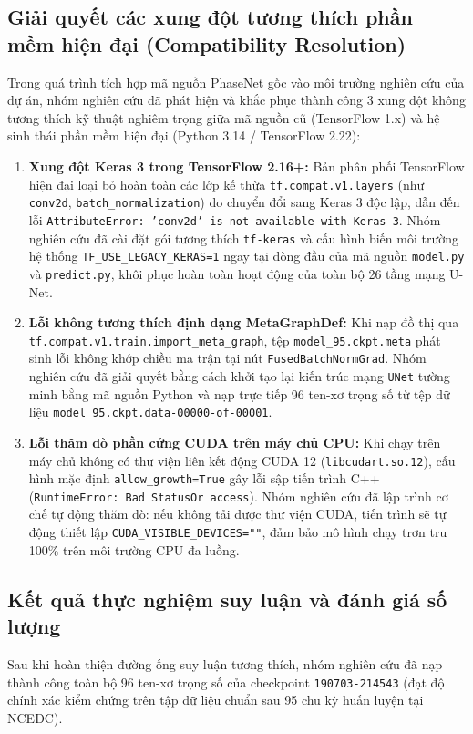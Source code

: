 \documentclass[preprint,1p]{elsarticle}
\begin{document}
\subsection{Giải quyết các xung đột tương thích phần mềm hiện đại (Compatibility Resolution)}
Trong quá trình tích hợp mã nguồn PhaseNet gốc vào môi trường nghiên cứu của dự án, nhóm nghiên cứu đã phát hiện và khắc phục thành công 3 xung đột không tương thích kỹ thuật nghiêm trọng giữa mã nguồn cũ (TensorFlow 1.x) và hệ sinh thái phần mềm hiện đại (Python 3.14 / TensorFlow 2.22):
\begin{enumerate}
    \item \textbf{Xung đột Keras 3 trong TensorFlow 2.16+:} Bản phân phối TensorFlow hiện đại loại bỏ hoàn toàn các lớp kế thừa \texttt{tf.compat.v1.layers} (như \texttt{conv2d}, \texttt{batch\_normalization}) do chuyển đổi sang Keras 3 độc lập, dẫn đến lỗi \texttt{AttributeError: 'conv2d' is not available with Keras 3}. Nhóm nghiên cứu đã cài đặt gói tương thích \texttt{tf-keras} và cấu hình biến môi trường hệ thống \texttt{TF\_USE\_LEGACY\_KERAS=1} ngay tại dòng đầu của mã nguồn \texttt{model.py} và \texttt{predict.py}, khôi phục hoàn toàn hoạt động của toàn bộ 26 tầng mạng U-Net.
    \item \textbf{Lỗi không tương thích định dạng MetaGraphDef:} Khi nạp đồ thị qua \texttt{tf.compat.v1.train.import\_meta\_graph}, tệp \texttt{model\_95.ckpt.meta} phát sinh lỗi không khớp chiều ma trận tại nút \texttt{FusedBatchNormGrad}. Nhóm nghiên cứu đã giải quyết bằng cách khởi tạo lại kiến trúc mạng \texttt{UNet} tường minh bằng mã nguồn Python và nạp trực tiếp 96 ten-xơ trọng số từ tệp dữ liệu \texttt{model\_95.ckpt.data-00000-of-00001}.
    \item \textbf{Lỗi thăm dò phần cứng CUDA trên máy chủ CPU:} Khi chạy trên máy chủ không có thư viện liên kết động CUDA 12 (\texttt{libcudart.so.12}), cấu hình mặc định \texttt{allow\_growth=True} gây lỗi sập tiến trình C++ (\texttt{RuntimeError: Bad StatusOr access}). Nhóm nghiên cứu đã lập trình cơ chế tự động thăm dò: nếu không tải được thư viện CUDA, tiến trình sẽ tự động thiết lập \texttt{CUDA\_VISIBLE\_DEVICES=""}, đảm bảo mô hình chạy trơn tru 100\% trên môi trường CPU đa luồng.
\end{enumerate}

\subsection{Kết quả thực nghiệm suy luận và đánh giá số lượng}
Sau khi hoàn thiện đường ống suy luận tương thích, nhóm nghiên cứu đã nạp thành công toàn bộ 96 ten-xơ trọng số của checkpoint \texttt{190703-214543} (đạt độ chính xác kiểm chứng trên tập dữ liệu chuẩn sau 95 chu kỳ huấn luyện tại NCEDC).
\end{document}
